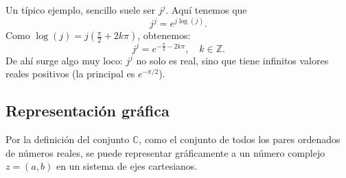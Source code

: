 \begin{example}
  Un típico ejemplo, sencillo suele ser $j^j$. Aquí tenemos que
  \[
  j^j = e^{j \log(j)}.
  \]
  Como \(\log(j) = j\left(\tfrac{\pi}{2} + 2k\pi\right)\), obtenemos:
  \[
  j^j = e^{-\tfrac{\pi}{2} - 2k\pi}, \quad k \in \mathbb{Z}.
  \]
  De ahí surge algo muy loco: \(j^j\) no solo es real, sino que tiene infinitos valores reales positivos (la principal es \(e^{-\pi/2}\)).
\end{example}

\subsection{Representación gráfica}

Por la definición del conjunto $\mathbb{C}$, como el conjunto de todos los pares ordenados de números reales, se puede representar gráficamente a un número complejo $z=(a,b)$ en un sistema de ejes cartesianos.
\begin{figure}[ht]
  \centering
\end{figure}
